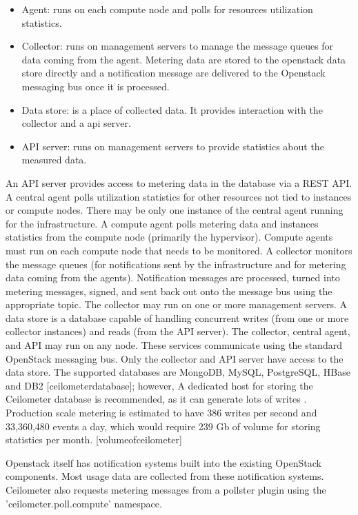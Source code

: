 \documentclass{sig-alternate}
\begin{document}
\begin{itemize}
  \item Agent: runs on each compute node and polls for resources utilization statistics.
  \item Collector: runs on management servers to manage the message queues for data coming from the agent. Metering data are stored to the openstack data store directly and a notification message are delivered to the Openstack messaging bus once it is processed.
  \item Data store: is a place of collected data. It provides interaction with the collector and a api server.
  \item API server: runs on management servers to provide statistics about the measured data.
\end{itemize}

An API server provides access to metering data in the database via a REST API. A central agent polls utilization statistics for other resources not tied to instances or compute nodes. There may be only one instance of the central agent running for the infrastructure. A compute agent polls metering data and instances statistics from the compute node (primarily the hypervisor). Compute agents must run on each compute node that needs to be monitored. A collector monitors the message queues (for notifications sent by the infrastructure and for metering data coming from the agents). Notification messages are processed, turned into metering messages, signed, and sent back out onto the message bus using the appropriate topic. The collector may run on one or more management servers. A data store is a database capable of handling concurrent writes (from one or more collector instances) and reads (from the API server). The collector, central agent, and API may run on any node. These services communicate using the standard OpenStack messaging bus. Only the collector and API server have access to the data store. The supported databases are MongoDB, MySQL, PostgreSQL, HBase and DB2 [ceilometerdatabase]; however, A dedicated host for storing the Ceilometer database is recommended, as it can generate lots of writes . Production scale metering is estimated to have 386 writes per second and 33,360,480 events a day, which would require 239 Gb of volume for storing statistics per month. [volumeofceilometer]

Openstack itself has notification systems built into the existing OpenStack components. Most usage data are collected from these notification systems. Ceilometer also requests metering messages from a pollster plugin using the 'ceilometer.poll.compute' namespace.
\end{document}
